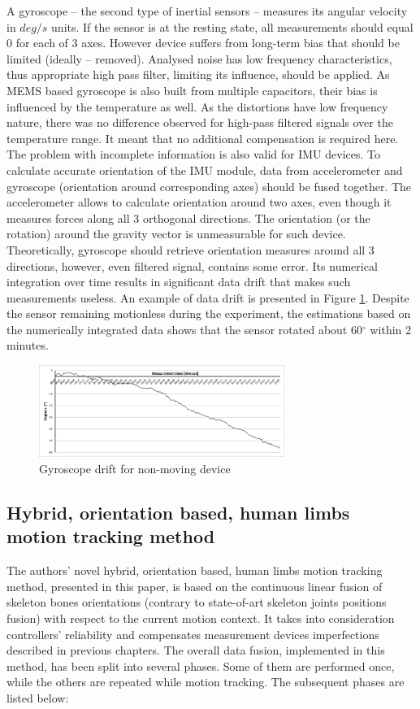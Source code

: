 \documentclass[sensors,article,submit,moreauthors,pdftex,10pt,a4paper]{mdpi}
\newcommand{\degree}{\ensuremath{{}^{\circ}}\xspace}
\begin{document}
A gyroscope – the second type of inertial sensors – measures its angular velocity in $deg/s$  units. If the sensor is at the resting state, all measurements should equal 0 for each of 3 axes. However device suffers from long-term bias that should be limited (ideally – removed). Analysed noise has low frequency characteristics, thus appropriate high pass filter, limiting its influence, should be applied. As MEMS based gyroscope is also built from multiple capacitors, their bias is influenced by the temperature as well. As the distortions have low frequency nature, there was no difference observed for high-pass filtered signals over the temperature range. It meant that no additional compensation is required here. 
The problem with incomplete information is also valid for IMU devices. To calculate accurate orientation of the IMU module, data from accelerometer and gyroscope (orientation around corresponding axes) should be fused together. The accelerometer allows to calculate orientation around two axes, even though it measures forces along all 3 orthogonal directions. The orientation (or the rotation) around the gravity vector is unmeasurable for such device. Theoretically, gyroscope should retrieve orientation measures around all 3 directions, however, even filtered signal, contains some error. Its numerical integration over time results in significant data drift that makes such measurements useless. An example of data drift is presented in Figure \ref{fig:imu:drift}. Despite the sensor remaining motionless during the experiment, the estimations based on the numerically integrated data shows that the sensor rotated about $60\degree$ within 2 minutes.
\begin{figure}[H]
	\centering
	\includegraphics[width=8cm]{Figure7.png}
	\caption{Gyroscope drift for non-moving device}
	\label{fig:imu:drift}
\end{figure}

\subsection{Hybrid, orientation based, human limbs motion tracking method}
The authors’ novel hybrid, orientation based, human limbs motion tracking method, presented in this paper, is based on the continuous linear fusion of skeleton bones orientations (contrary to state-of-art skeleton joints positions fusion) with respect to the current motion context. It takes into consideration controllers’ reliability and compensates measurement devices imperfections described in previous chapters.
The overall data fusion, implemented in this method, has been split into several phases. Some of them are performed once, while the others are repeated while motion tracking. The subsequent phases are listed below:
\end{document}
